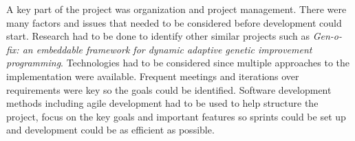 A key part of the project was organization and project management. There were many
factors and issues that needed to be considered before development could start. Research had to be done to identify
other similar projects such as \textit{Gen-o-fix: an embeddable framework for dynamic adaptive genetic improvement programming}\cite{genofix}.
Technologies had to be considered since multiple approaches to the implementation were available. Frequent meetings and 
iterations over requirements were key so the goals could be identified. Software development methods including agile development had to be used to help structure the
project, focus on the key goals and important features so sprints could be set up and development could be as efficient as possible.